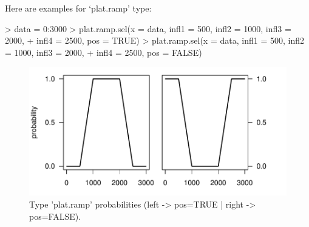 \documentclass[letterpaper, 12pt]{article}
\begin{document}
\newpage

Here are examples for `plat.ramp' type:
\begin{Schunk}
\begin{Sinput}
> data = 0:3000
> plat.ramp.sel(x = data, infl1 = 500, infl2 = 1000, infl3 = 2000, 
+     infl4 = 2500, pos = TRUE)
> plat.ramp.sel(x = data, infl1 = 500, infl2 = 1000, infl3 = 2000, 
+     infl4 = 2500, pos = FALSE)
\end{Sinput}
\end{Schunk}
\begin{figure}[h]
\vspace{-20pt}
\begin{center}
\includegraphics{relation_sel-019}
\end{center}
\vspace{-30pt}
\caption{Type 'plat.ramp' probabilities (left -> pos=TRUE |  right -> pos=FALSE).}
\vspace{-10pt}
\label{fig9}
\end{figure}
\end{document}
